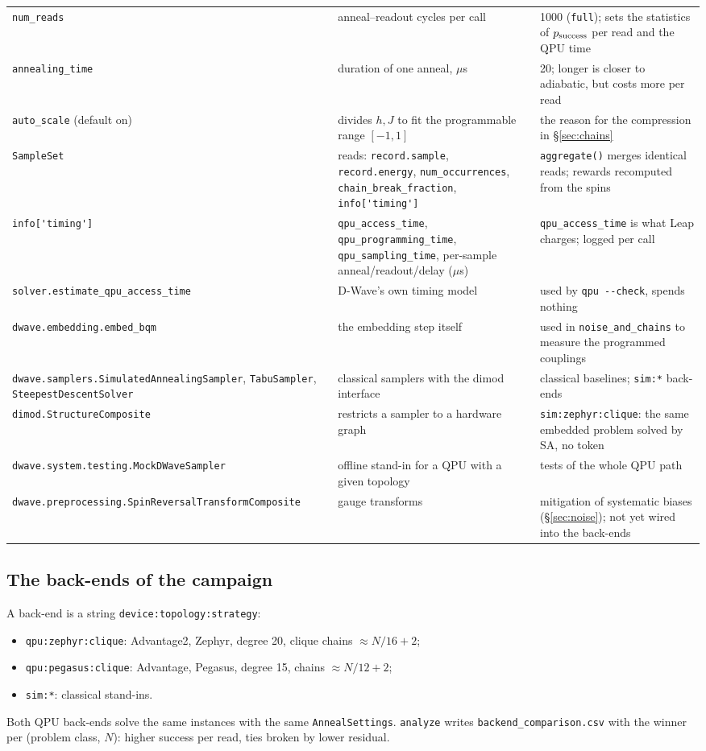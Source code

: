 \documentclass[11pt,a4paper]{article}
\newcommand{\code}[1]{\nolinkurl{#1}}
\begin{document}
{\begin{longtable}{L{4.0cm}L{5.4cm}L{5.6cm}}
\code{num_reads} & anneal--readout cycles per call & 1000 (\code{full}); sets the statistics of $p_{\rm success}$ per read and the QPU time \\
\code{annealing_time} & duration of one anneal, $\mu$s & 20; longer is closer to adiabatic, but costs more per read \\
\code{auto_scale} (default on) & divides $h,J$ to fit the programmable range $[-1,1]$ & the reason for the compression in \S\ref{sec:chains} \\
\code{SampleSet} & reads: \code{record.sample}, \code{record.energy}, \code{num_occurrences}, \code{chain_break_fraction}, \code{info['timing']} & \code{aggregate()} merges identical reads; rewards recomputed from the spins \\
\code{info['timing']} & \code{qpu_access_time}, \code{qpu_programming_time}, \code{qpu_sampling_time}, per-sample anneal/readout/delay ($\mu$s) & \code{qpu_access_time} is what Leap charges; logged per call \\
\code{solver.estimate_qpu_access_time} & D-Wave's own timing model & used by \code{qpu --check}, spends nothing \\
\code{dwave.embedding.embed_bqm} & the embedding step itself & used in \code{noise_and_chains} to measure the programmed couplings \\
\code{dwave.samplers.SimulatedAnnealingSampler}, \code{TabuSampler}, \code{SteepestDescentSolver} & classical samplers with the dimod interface & classical baselines; \code{sim:*} back-ends \\
\code{dimod.StructureComposite} & restricts a sampler to a hardware graph & \code{sim:zephyr:clique}: the same embedded problem solved by SA, no token \\
\code{dwave.system.testing.MockDWaveSampler} & offline stand-in for a QPU with a given topology & tests of the whole QPU path \\
\code{dwave.preprocessing.SpinReversalTransformComposite} & gauge transforms & mitigation of systematic biases (\S\ref{sec:noise}); not yet wired into the back-ends \\
\bottomrule
\end{longtable}}

\subsection{The back-ends of the campaign}
A back-end is a string \code{device:topology:strategy}:
\begin{itemize}
\item \code{qpu:zephyr:clique}: Advantage2, Zephyr, degree 20, clique chains $\approx N/16+2$;
\item \code{qpu:pegasus:clique}: Advantage, Pegasus, degree 15, chains $\approx N/12+2$;
\item \code{sim:*}: classical stand-ins.
\end{itemize}
Both QPU back-ends solve the same instances with the same \code{AnnealSettings}. \code{analyze} writes
\code{backend_comparison.csv} with the winner per (problem class, $N$): higher success per read, ties broken by
lower residual.
\end{document}
